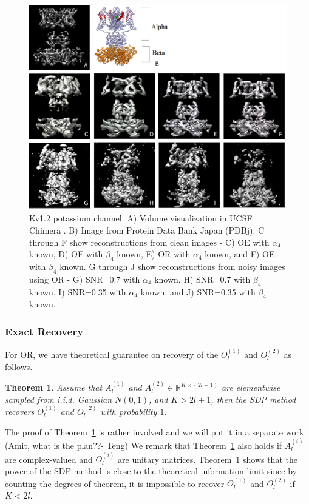 \documentclass{article}
\newtheorem{thm}{Theorem}
\begin{document}
\begin{figure}[t]
\begin{center}
\includegraphics[width=.99\columnwidth]{reconstruction_all.png}
\end{center}
\vspace{-.1in}
\caption{Kv1.2 potassium channel: A) Volume visualization in UCSF Chimera \cite{chimera}. B) Image from Protein Data Bank Japan (PDBj). C through F show reconstructions from clean images - C) OE with $\alpha_4$ known, D) OE with $\beta_4$ known, E) OR with $\alpha_4$ known, and F) OE with $\beta_4$ known. G through J show reconstructions from noisy images using OR - G) SNR=0.7 with $\alpha_4$ known, H) SNR=0.7 with $\beta_4$ known, I) SNR=0.35 with $\alpha_4$ known, and J) SNR=0.35 with $\beta_4$ known.}
\label{fig:truth}
\vspace{-.1in}
\end{figure}
\subsubsection{Exact Recovery}
For OR, we have theoretical guarantee on recovery of the $O_l^{(1)}$ and $O_l^{(2)}$ as follows.
\begin{thm}\label{thm:recovery}
Assume that $A_l^{(1)}$ and $A_l^{(2)}\in\mathbb{R}^{K\times (2l+1)}$ are elementwise sampled from i.i.d. Gaussian $N(0,1)$, and $K>2l+1$, then the SDP method recovers $O_l^{(1)}$ and $O_l^{(2)}$ with probability $1$.
\end{thm}

The proof of Theorem~\ref{thm:recovery} is rather involved and we will put it in a separate work (Amit, what is the plan??- Teng) We remark that Theorem~\ref{thm:recovery} also holds if $A_l^{(i)}$ are complex-valued and $O_l^{(i)}$ are unitary matrices. Theorem~\ref{thm:recovery} shows that the power of the SDP method is close to the theoretical information limit since by counting the degrees of theorem, it is impossible to recover $O_l^{(1)}$ and $O_l^{(2)}$ if $K< 2l$.
\end{document}
